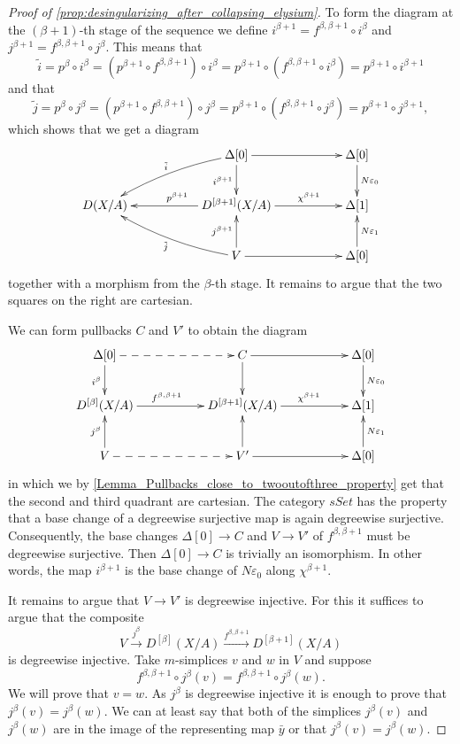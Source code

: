 \begin{proof}[Proof of \cref{prop:desingularizing_after_collapsing_elysium}]
To form the diagram at the $(\beta +1)$-th stage of the sequence we define $i^{\beta +1}=f^{\beta ,\beta +1}\circ i^\beta$ and $j^{\beta +1}=f^{\beta ,\beta +1}\circ j^\beta$. This means that
\[\tilde{i} =p^\beta \circ i^\beta =(p^{\beta +1}\circ f^{\beta ,\beta +1})\circ i^\beta =p^{\beta +1}\circ (f^{\beta ,\beta +1}\circ i^\beta )=p^{\beta +1}\circ i^{\beta +1}\]
and that
\[\tilde{j} =p^\beta \circ j^\beta =(p^{\beta +1}\circ f^{\beta ,\beta +1})\circ j^\beta =p^{\beta +1}\circ (f^{\beta ,\beta +1}\circ j^\beta )=p^{\beta +1}\circ j^{\beta +1},\]
which shows that we get a diagram
\begin{displaymath}
\xymatrix{
&& \Delta [0] \ar@/_/[lld]_{\tilde{i} } \ar[d]_{i^{\beta +1}} \ar[rr] && \Delta [0] \ar[d]^{N\varepsilon _0} \\
D(X/A) && D^{[\beta +1]}(X/A) \ar[ll]_(.45){p^{\beta +1}} \ar[rr]^(.6){\chi ^{\beta +1}} && \Delta [1] \\
&& V \ar@/^/[llu]^{\tilde{j} } \ar[u]^{j^{\beta +1}} \ar[rr] && \Delta [0] \ar[u]_{N\varepsilon _1}
}
\end{displaymath}
together with a morphism from the $\beta$-th stage. It remains to argue that the two squares on the right are cartesian.

We can form pullbacks $C$ and $V'$ to obtain the diagram
\begin{displaymath}
\xymatrix{
\Delta [0] \ar[d]_{i^\beta } \ar@{-->}[rr] && C \ar[d] \ar[rr] && \Delta [0] \ar[d]^{N\varepsilon _0} \\
D^{[\beta ]}(X/A) \ar[rr]^(.45){f^{\beta ,\beta +1}} && D^{[\beta +1]}(X/A) \ar[rr]^(.55){\chi ^{\beta +1}} && \Delta [1] \\
V \ar[u]^{j^\beta } \ar@{-->}[rr] && V' \ar[u] \ar[rr] && \Delta [0] \ar[u]_{N\varepsilon _1}
}
\end{displaymath}
in which we by \cref{Lemma_Pullbacks_close_to_twooutofthree_property} get that the second and third quadrant are cartesian. The category $sSet$ has the property that a base change of a degreewise surjective map is again degreewise surjective. Consequently, the base changes $\Delta [0]\to C$ and $V\to V'$ of $f^{\beta ,\beta +1}$ must be degreewise surjective. Then $\Delta [0]\to C$ is trivially an isomorphism. In other words, the map $i^{\beta +1}$ is the base change of $N\varepsilon _0$ along $\chi ^{\beta +1}$.

It remains to argue that $V\to V'$ is degreewise injective. For this it suffices to argue that the composite
\[V\xrightarrow{j^\beta } D^{[\beta ]}(X/A)\xrightarrow{f^{\beta ,\beta +1} } D^{[\beta +1]}(X/A)\]
is degreewise injective. Take $m$-simplices $v$ and $w$ in $V$ and suppose
\[f^{\beta ,\beta +1}\circ j^\beta (v) =f^{\beta ,\beta +1}\circ j^\beta (w) .\]
We will prove that $v=w$. As $j^\beta$ is degreewise injective it is enough to prove that $j^\beta (v) =j^\beta (w)$. We can at least say that both of the simplices $j^\beta (v)$ and $j^\beta (w)$ are in the image of the representing map $\bar{y}$ or that $j^\beta (v)=j^\beta (w)$.


\end{proof}
